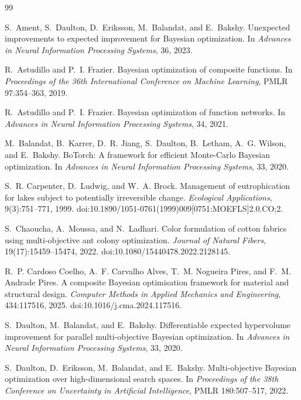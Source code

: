 \documentclass{article}
\begin{document}
\clearpage

\begin{thebibliography}{99}

S.~Ament, S.~Daulton, D.~Eriksson, M.~Balandat, and E.~Bakshy.
Unexpected improvements to expected improvement for Bayesian optimization.
In \emph{Advances in Neural Information Processing Systems}, 36, 2023.

R.~Astudillo and P.~I. Frazier.
Bayesian optimization of composite functions.
In \emph{Proceedings of the 36th International Conference on Machine Learning},
PMLR 97:354--363, 2019.

R.~Astudillo and P.~I. Frazier.
Bayesian optimization of function networks.
In \emph{Advances in Neural Information Processing Systems}, 34, 2021.

M.~Balandat, B.~Karrer, D.~R. Jiang, S.~Daulton, B.~Letham, A.~G. Wilson, and E.~Bakshy.
BoTorch: A framework for efficient Monte-Carlo Bayesian optimization.
In \emph{Advances in Neural Information Processing Systems}, 33, 2020.

S.~R. Carpenter, D.~Ludwig, and W.~A. Brock.
Management of eutrophication for lakes subject to potentially irreversible change.
\emph{Ecological Applications}, 9(3):751--771, 1999.
doi:10.1890/1051-0761(1999)009[0751:MOEFLS]2.0.CO;2.

S.~Chaoucha, A.~Moussa, and N.~Ladhari.
Color formulation of cotton fabrics using multi-objective ant colony optimization.
\emph{Journal of Natural Fibers}, 19(17):15459--15474, 2022.
doi:10.1080/15440478.2022.2128145.

R.~P. Cardoso Coelho, A.~F. Carvalho Alves, T.~M. Nogueira Pires, and
F.~M. Andrade Pires.
A composite Bayesian optimisation framework for material and structural design.
\emph{Computer Methods in Applied Mechanics and Engineering}, 434:117516, 2025.
doi:10.1016/j.cma.2024.117516.

S.~Daulton, M.~Balandat, and E.~Bakshy.
Differentiable expected hypervolume improvement for parallel multi-objective
Bayesian optimization.
In \emph{Advances in Neural Information Processing Systems}, 33, 2020.

S.~Daulton, D.~Eriksson, M.~Balandat, and E.~Bakshy.
Multi-objective Bayesian optimization over high-dimensional search spaces.
In \emph{Proceedings of the 38th Conference on Uncertainty in Artificial
Intelligence}, PMLR 180:507--517, 2022.


\end{thebibliography}
\end{document}
